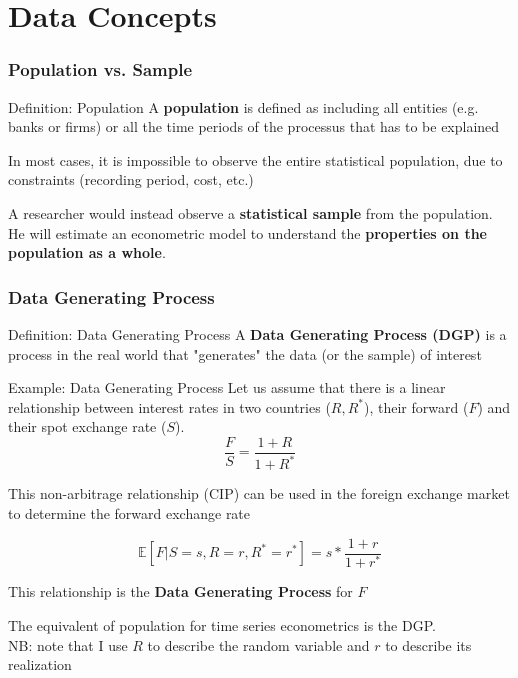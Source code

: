 \documentclass{beamer}
\newenvironment{wideitemize}{\itemize\addtolength{\itemsep}{10pt}}{\enditemize}
\begin{document}
\section{Data Concepts}
\begin{frame}
  \frametitle{Population vs. Sample}

  \begin{block}{Definition: Population}
    A \textbf{population} is defined as including all entities (e.g. banks or firms) or all the time periods of the processus that has to be explained
  \end{block}

\smallskip
  
  \begin{wideitemize}
    \item In most cases, it is impossible to observe the entire statistical population, due to constraints (recording period, cost, etc.)
    \item A researcher would instead observe a \textbf{statistical sample} from the population. He will estimate an econometric model to understand the \textbf{properties on the population as a whole}.
  \end{wideitemize} 
\end{frame}


\begin{frame}
  \frametitle{Data Generating Process}
  
  \begin{block}{Definition: Data Generating Process}
    A \textbf{Data Generating Process (DGP)} is a process in the real world that "generates" the data (or the sample) of interest
  \end{block}

  \begin{exampleblock}{Example: Data Generating Process}
    Let us assume that there is a linear relationship between interest rates in two countries ($R, R^*$), their forward ($F$) and their spot exchange rate ($S$).\\

    \begin{equation*}
      \frac{F}{S} = \frac{1+R}{1+R^*}
    \end{equation*}

    This non-arbitrage relationship (CIP) can be used in the foreign exchange market to determine the forward exchange rate

    \begin{equation*}
      \mathbb{E}[F |S=s, R=r, R^*= r^*] = s*\frac{1+r}{1+r^*}
    \end{equation*}

This relationship is the \textbf{Data Generating Process} for $F$     
  \end{exampleblock}

The equivalent of population for time series econometrics is the DGP.\\
NB: note that I use $R$ to describe the random variable and $r$ to describe its realization
  
\end{frame}
\end{document}
